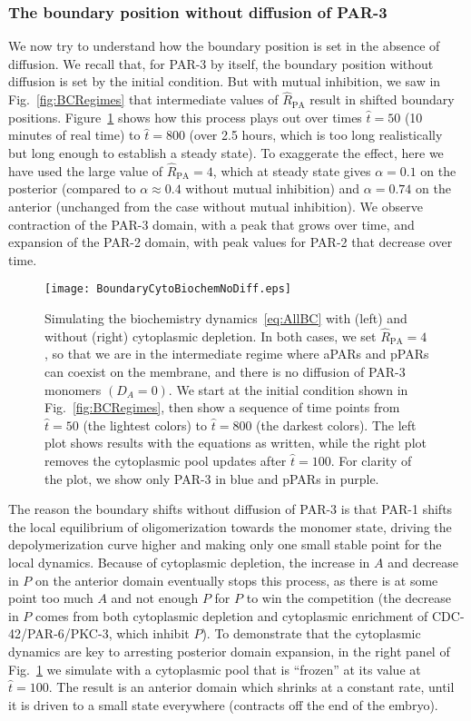 \documentclass[11pt]{article}
\newcommand{\6}[1]{#1_{\text{6}}}
\newcommand{\3}[1]{#1_{\text{3}}}
\begin{document}
\subsubsection{The boundary position without diffusion of PAR-3}
We now try to understand how the boundary position is set in the absence of diffusion. We recall that, for PAR-3 by itself, the boundary position without diffusion is set by the initial condition. But with mutual inhibition, we saw in Fig.\ \ref{fig:BCRegimes} that intermediate values of $\hat R_\text{PA}$ result in shifted boundary positions. Figure\ \ref{fig:BoundaryNoDiff} shows how this process plays out over times $\hat t = 50$ (10 minutes of real time) to $\hat t = 800$ (over 2.5 hours, which is too long realistically but long enough to establish a steady state). To exaggerate the effect, here we have used the large value of $\hat R_\text{PA}=4$, which at steady state gives $\alpha=0.1$ on the posterior (compared to $\alpha \approx 0.4$ without mutual inhibition) and $\alpha=0.74$ on the anterior (unchanged from the case without mutual inhibition). We observe contraction of the PAR-3 domain, with a peak that grows over time, and expansion of the PAR-2 domain, with peak values for PAR-2 that decrease over time. 

\begin{figure}
\centering
\texttt{[image: BoundaryCytoBiochemNoDiff.eps]}
\caption{\label{fig:BoundaryNoDiff}Simulating the biochemistry dynamics\ \eqref{eq:AllBC} with (left) and without (right) cytoplasmic depletion. In both cases, we set $\hat R_\text{PA}=4$, so that we are in the intermediate regime where aPARs and pPARs can coexist on the membrane, and there is no diffusion of PAR-3 monomers $\left(D_A=0\right)$. We start at the initial condition shown in Fig.\ \ref{fig:BCRegimes}, then show a sequence of time points from $\hat t = 50$ (the lightest colors) to $\hat t = 800$ (the darkest colors). The left plot shows results with the equations as written, while the right plot removes the cytoplasmic pool updates after $\hat t = 100$. For clarity of the plot, we show only PAR-3 in blue and pPARs in purple.}
\end{figure}

The reason the boundary shifts without diffusion of PAR-3 is that PAR-1 shifts the local equilibrium of oligomerization towards the monomer state, driving the depolymerization curve higher and making only one small stable point for the local dynamics. Because of cytoplasmic depletion, the increase in $A$ and decrease in $P$ on the anterior domain eventually stops this process, as there is at some point too much $A$ and not enough $P$ for $P$ to win the competition (the decrease in $P$ comes from both cytoplasmic depletion and cytoplasmic enrichment of CDC-42/PAR-6/PKC-3, which inhibit $P$). To demonstrate that the cytoplasmic dynamics are key to arresting posterior domain expansion, in the right panel of Fig.\ \ref{fig:BoundaryNoDiff} we simulate with a cytoplasmic pool that is ``frozen'' at its value at $\hat t = 100$. The result is an anterior domain which shrinks at a constant rate, until it is driven to a small state everywhere (contracts off the end of the embryo). 
\end{document}

